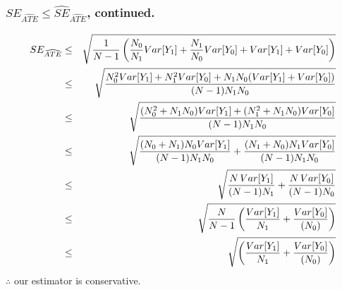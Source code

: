 \documentclass[xcolor=dvipsnames]{beamer}
\begin{document}
\begin{frame}
  \frametitle{$SE_{\widehat{ATE}}\leq \widehat{SE}_{\widehat{ATE}}$, continued.}
\scriptsize
\begin{eqnarray*}
\scriptsize
  SE_{\widehat{ATE}} & \leq &\sqrt{\frac{1}{N-1}\left( \frac{N_0}{N_1}Var[Y_1]+\frac{N_1}{N_0}Var[Y_0]  + Var[Y_1]+Var[Y_0]\right)} \\
  & \leq & \sqrt{ \frac{N_0^2Var[Y_1]+N_1^2 Var[Y_0] + N_1 N_0 (Var[Y_1]+Var[Y_0])}{(N-1)N_1 N_0}} \\
  & \leq & \sqrt{ \frac{(N_0^2 + N_1 N_0) Var[Y_1]+(N_1^2 + N_1 N_0) Var[Y_0] }{(N-1)N_1 N_0}} \\
    & \leq & \sqrt{ \frac{(N_0 + N_1) N_0 Var[Y_1]}{(N-1) N_1 N_0}+ \frac{ (N_1 + N_0) N_1  Var[Y_0]}{(N-1)N_1 N_0}}  \\
    & \leq & \sqrt{ \frac{N \,  Var[Y_1]}{(N-1) N_1 }+ \frac{ N \, Var[Y_0]}{(N-1) N_0}}  \\
    & \leq & \sqrt{\frac{N}{N-1} \left(\frac{Var[Y_1]}{N_1}+ \frac{ Var[Y_0]}{(N_0)}\right)}  \\
    &\leq & \sqrt{ \left(\frac{Var[Y_1]}{N_1}+ \frac{ Var[Y_0]}{(N_0)}\right)}
\end{eqnarray*}
\small
$\therefore$ our estimator is conservative.
\end{frame}
\end{document}
